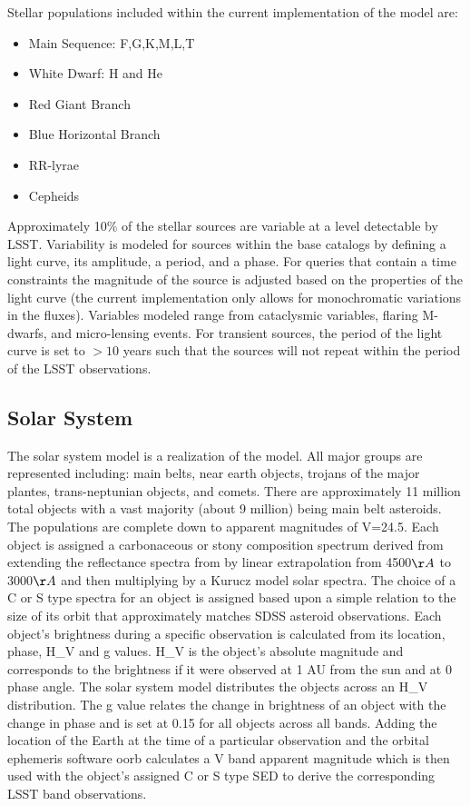 \documentclass[]{article}
\begin{document}
Stellar  populations included within the current implementation of the model are:
\begin{itemize}
\item Main Sequence: F,G,K,M,L,T
\item White Dwarf: H and He
\item Red Giant Branch
\item Blue Horizontal Branch
\item RR-lyrae
\item Cepheids
\end{itemize}

Approximately 10\% of the stellar sources are variable at a level detectable
by LSST.
Variability is modeled for sources within the base catalogs
by defining a light curve, its amplitude, a period, and a phase. For
queries that contain a time constraints the magnitude of the source is
adjusted based on the properties of the light curve (the current
implementation only allows for monochromatic variations in the
fluxes). Variables modeled range from cataclysmic variables, flaring
M-dwarfs, and micro-lensing events. For transient sources, the period
of the light curve is set to $>10$ years such that the sources will
not repeat within the period of the LSST observations.


\subsection{Solar System \label{sec:ssm}}

The solar system model is a realization of the \cite{grav} model.  All
major groups are represented including: main belts, near earth
objects, trojans of the major plantes, trans-neptunian objects, and
comets. There are approximately 11 million total objects with a vast
majority (about 9 million) being main belt asteroids. The populations
are complete down to apparent magnitudes of V=24.5.  Each object is
assigned a carbonaceous or stony composition spectrum derived from
extending the reflectance spectra from \cite{demeo} by linear
extrapolation from 4500$\AA$ to 3000$\AA$ and then multiplying by a
Kurucz model solar spectra. The choice of a C or S type spectra for an
object is assigned based upon a simple relation to the size of its
orbit that approximately matches SDSS asteroid observations. Each
object's brightness during a specific observation is calculated from
its location, phase, H\_V and g values. H\_V is the object's absolute
magnitude and corresponds to the brightness if it were observed at 1
AU from the sun and at 0 phase angle. The solar system model
distributes the objects across an H\_V distribution. The g value
relates the change in brightness of an object with the change in phase
and is set at 0.15 for all objects across all bands. Adding the
location of the Earth at the time of a particular observation and the
orbital ephemeris software oorb calculates a V band apparent magnitude
which is then used with the object's assigned C or S type SED to
derive the corresponding LSST band observations.
\end{document}
